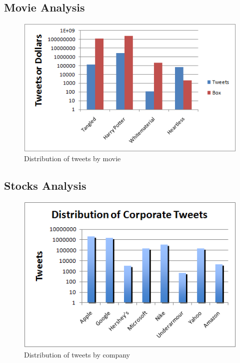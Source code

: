 \documentclass[11pt]{article}
\begin{document}
\subsection{Movie Analysis}

\begin{figure}[ht!]
\centering
\includegraphics[scale=.5]{img/moviebox.png} 
\caption{Distribution of tweets by movie}
\end{figure}


\subsection{Stocks Analysis}
\begin{figure}[ht!]
\centering
\includegraphics[scale=.65]{img/purestocktweets.png} 
\caption{Distribution of tweets by company}
\end{figure}
\end{document}
